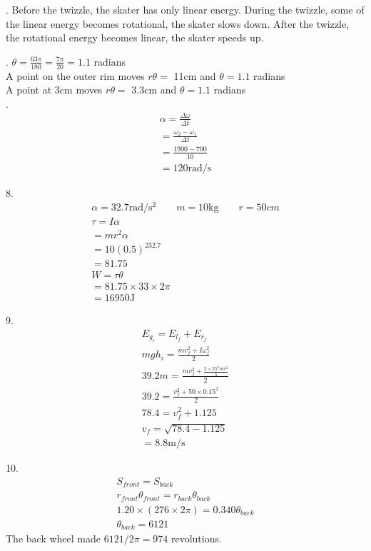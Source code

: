 \documentclass[12pt]{article}
\begin{document}
.
Before the twizzle, the skater has only linear energy.
During the twizzle, some of the linear energy becomes rotational, the skater slows down.
After the twizzle, the rotational energy becomes linear, the skater speeds up.



.
$\theta = \frac{63\pi}{180} = \frac{7\pi}{20} = 1.1$ radians \\
A point on the outer rim moves $r\theta = $ 11cm and $\theta = 1.1$ radians \\
A point at 3cm moves $r\theta = $ 3.3cm and $\theta = 1.1$ radians \\



.
\begin{gather*}
\alpha = \frac{\Delta\omega}{\Delta t} \\
= \frac{\omega_2 - \omega_1}{\Delta t} \\
= \frac{1900 - 700}{10} \\
= 120\text{rad/s}
\end{gather*}



8.
\begin{gather*}
\alpha = 32.7\text{rad/s$^2$} \qquad m = 10\text{kg} \qquad r = 50cm\\
\tau = I\alpha \\
= mr^2\alpha \\
= 10(0.5)^232.7 \\
= 81.75 \\
W = \tau\theta \\
= 81.75 \times 33 \times 2\pi \\
= 16950\text{J}
\end{gather*}



9.
\begin{gather*}
E_{g_i} = E_{l_f} + E_{r_f} \\
mgh_i = \frac{mv_f^2 + I\omega_f^2}{2} \\
39.2m = \frac{mv_f^2 + \frac{2 \times 25^2 mr^2}{5}}{2} \\
39.2 = \frac{v_f^2 + 50 \times 0.15^2}{2} \\
78.4 = v^2_f + 1.125 \\
v_f = \sqrt{78.4 - 1.125} \\
= 8.8\text{m/s}
\end{gather*}



10.
\begin{gather*}
S_{front} = S_{back} \\
r_{front}\theta_{front} = r_{back}\theta_{back} \\
1.20 \times (276 \times 2 \pi) = 0.340\theta_{back} \\
\theta_{back} = 6121
\end{gather*}
The back wheel made $6121/2\pi = 974$ revolutions.
\end{document}
